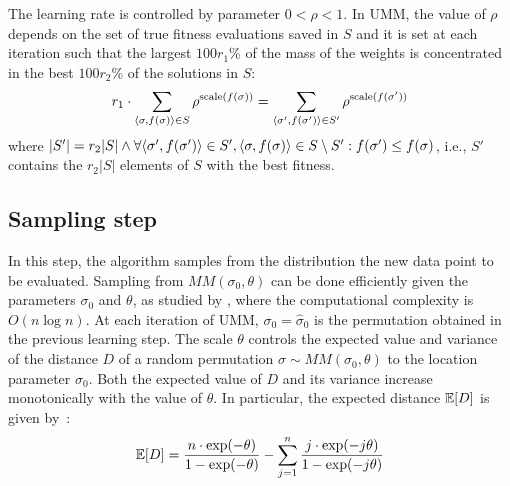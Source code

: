 \documentclass[sigconf,dvipsnames]{acmart}
\begin{document}
The learning rate is
controlled by parameter $0 < \rho < 1$. 
In UMM, the value of $\rho$ depends on the set of true fitness evaluations saved in $S$
and it is set at each iteration such that the largest $100r_1$\% of the mass of
the weights is concentrated in the best $100r_2$\% of the solutions in $S$:
%
% 
\begin{equation}
    r_1 \cdot \sum_{\tuple{\sigma,f(\sigma)}\in S}\rho^{\text{scale}(f(\sigma))} =  \sum_{\tuple{\sigma', f(\sigma')}\in S'}\rho^{\text{scale}(f(\sigma'))}  %
\end{equation}
%
where $|S'| = r_2|S| \land \forall \langle \sigma',f(\sigma')\rangle\in S', \langle \sigma,f(\sigma)\rangle\in S\setminus S' : f(\sigma')\leq f(\sigma)$, i.e., $S'$ contains the $r_2|S|$ elements of $S$ with the best fitness. 

\subsection{Sampling step}\label{sec:sampling}
In this step, the algorithm samples from the distribution the new data point to be evaluated. 
Sampling from $MM(\sigma_0,\theta)$  can be done efficiently given the parameters  $\sigma_0$ and $\theta$, as studied by \citet{IruCalLoz2016permallows}, where the computational complexity is $O(n\log n)$. %
%
At each iteration of UMM, $\sigma_0=\hat\sigma_0$ is the permutation obtained in the previous learning step. The scale $\theta$ controls the expected value and variance of the distance $D$ of a random permutation $\sigma\sim MM(\sigma_0, \theta)$ to the location parameter $\sigma_0$. Both  the expected value of $D$ and its variance increase monotonically with the value of $\theta$. In particular, the expected distance $\mathbb{E}[D]$ is given by~\cite{FliVer1986}:
%
\begin{equation}\label{eq:expectation}
\mathbb{E}[D] = \frac{n \cdot \exp(-\theta)}{1-\exp(-\theta)} - \sum_{j=1}^{n}  \frac{j\cdot\exp(-j  \theta)}{1-\exp(-j\theta)}
\end{equation}
\end{document}
